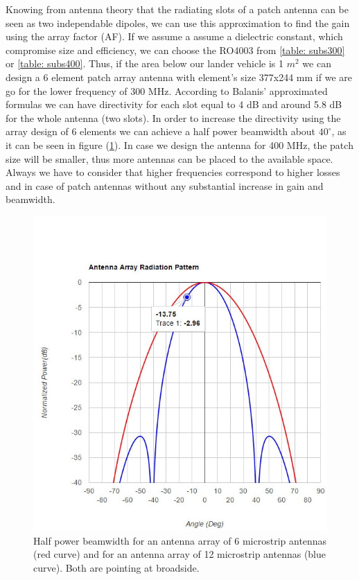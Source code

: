 \noindent
Knowing from antenna theory that the radiating slots of a patch antenna can be seen as two independable dipoles, we can use this approximation to find the gain using the array factor (AF). If we assume a assume a dielectric constant, which compromise size and efficiency, we can choose the RO4003 from \ref{table: subs300} or \ref{table: subs400}. Thus, if the area below our lander vehicle is 1 $m^2$ we can design a 6 element patch array antenna with element's size 377x244 mm if we are go for the lower frequency of 300 MHz. According to Balanis' approximated formulas we can have directivity for each slot equal to 4 dB and around 5.8 dB for the whole antenna (two slots). In order to increase the directivity using the array design of 6 elements we can achieve a half power beamwidth about $40^{\circ}$, as it can be seen in figure (\ref{array}). In case we design the antenna for 400 MHz, the patch size will be smaller, thus more antennas can be placed to the available space. Always we have to consider that higher frequencies correspond to higher losses and in case of patch antennas without any substantial increase in gain and beamwidth.

\begin{figure}[ht]
\centering
\includegraphics[width=.75\textwidth]{figures/Yannis/2results.jpg}
\caption{Half power beamwidth for an antenna array of 6 microstrip antennas (red curve) and for an antenna array of 12 microstrip antennas (blue curve). Both are pointing at broadside.}
\label{array}
\end{figure}

